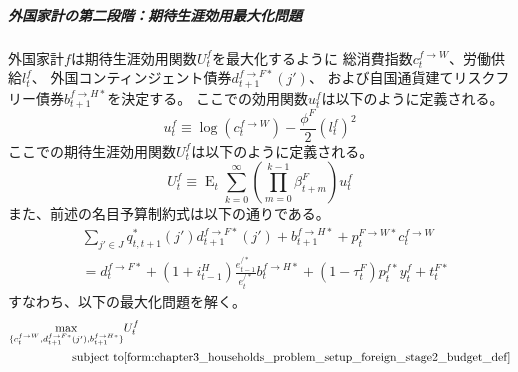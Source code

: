 \subparagraph{外国家計の第二段階：期待生涯効用最大化問題}
\label{sec:chapter3_households_problem_setup_foreign_stage2}
外国家計\(f\)は期待生涯効用関数\(U_t^f\)を最大化するように
総消費指数\(c_t^{f\to W}\)、労働供給\(l_t^f\)、
外国コンティンジェント債券\(d_{t+1}^{f\to F*}(j')\)、
および自国通貨建てリスクフリー債券\(b_{t+1}^{f\to H*}\)を決定する。
ここでの効用関数\(u_t^f\)は以下のように定義される。
\begin{equation}
\label{form:chapter3_households_problem_setup_foreign_stage2_u_f_def}
    u_t^f\equiv\log(c_t^{f\to W})-\frac{\phi^F}{2}(l_t^f)^2
\end{equation}
ここでの期待生涯効用関数\(U_t^f\)は以下のように定義される。
\begin{equation}
\label{form:chapter3_households_problem_setup_foreign_stage2_U_f_def}
    U_t^f\equiv\operatorname{E}_t\sum_{k=0}^{\infty}\left(\prod_{m=0}^{k-1}\beta_{t+m}^F\right)u_t^f
\end{equation}
また、前述の名目予算制約式は以下の通りである。
\begin{equation}
\label{form:chapter3_households_problem_setup_foreign_stage2_budget_def}
    \begin{split}
        &\sum_{j'\in J}q_{t,t+1}^*(j')d_{t+1}^{f\to F*}(j')+b_{t+1}^{f\to H*}+p_t^{F\to W*}c_t^{f\to W}\\
        &=d_t^{f\to F*}+(1+i_{t-1}^H)\frac{e_{t-1}^{/*}}{e_t^{/*}}b_t^{f\to H*}+(1-\tau_t^F)p_t^{f*}y_t^f+t_t^{F*}
    \end{split}
\end{equation}
すなわち、以下の最大化問題を解く。
\begin{equation}
\label{form:chapter3_households_problem_setup_foreign_stage2_max_def}
    \begin{aligned}
        \max_{\{c_t^{f\to W},d_{t+1}^{f\to F*}(j'),b_{t+1}^{f\to H*}\}}
        &U_t^f\\
        \text{subject to}
        &\eqref{form:chapter3_households_problem_setup_foreign_stage2_budget_def}
    \end{aligned}
\end{equation}